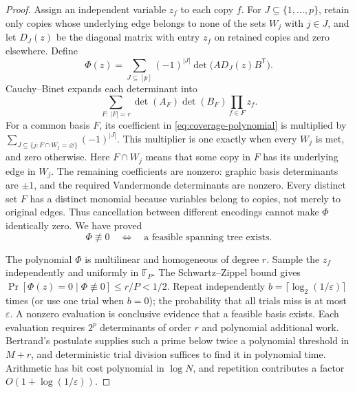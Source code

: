 \begin{proof}
Assign an independent variable $z_f$ to each copy $f$.  For
$J\subseteq\{1,\ldots,p\}$, retain only copies whose underlying edge
belongs to none of the sets $W_j$ with $j\in J$, and let $D_J(z)$ be the
diagonal matrix with entry $z_f$ on retained copies and zero elsewhere.
Define
\begin{equation}\label{eq:coverage-polynomial}
    \Phi(z)=\sum_{J\subseteq[p]}(-1)^{|J|}
                    \det\bigl(A D_J(z)B^{\mathsf T}\bigr).
\end{equation}
Cauchy--Binet expands each determinant into
\[
       \sum_{F:\,|F|=r}\det(A_F)\det(B_F)\prod_{f\in F}z_f.
\]
For a common basis $F$, its coefficient in \eqref{eq:coverage-polynomial}
is multiplied by
$\sum_{J\subseteq\{j:F\cap W_j=\varnothing\}}(-1)^{|J|}$.
This multiplier is one exactly when every $W_j$ is met, and zero otherwise.
Here $F\cap W_j$ means that some copy in $F$ has its underlying edge in
$W_j$.  The remaining coefficients are nonzero: graphic basis determinants
are $\pm1$, and the required Vandermonde determinants are nonzero.
Every distinct set $F$ has a distinct monomial because variables belong to
copies, not merely to original edges.  Thus cancellation between different
encodings cannot make $\Phi$ identically zero.  We have proved
\[
            \Phi\not\equiv0\quad\Longleftrightarrow\quad
            \text{a feasible spanning tree exists}.
\]

The polynomial $\Phi$ is multilinear and homogeneous of degree $r$.
Sample the $z_f$ independently and uniformly in $\mathbb F_P$.
The Schwartz--Zippel bound \cite{Schwartz1980,Zippel1979} gives
$\Pr[\Phi(z)=0\mid\Phi\not\equiv0]\leq r/P<1/2$.
Repeat independently $b=\lceil\log_2(1/\varepsilon)\rceil$ times
(or use one trial when $b=0$); the probability that all trials miss is at
most $\varepsilon$.  A nonzero evaluation is conclusive evidence that a
feasible basis exists.  Each evaluation requires $2^p$ determinants of order $r$ and polynomial
additional work.  Bertrand's postulate supplies such a prime below twice a polynomial
threshold in $M+r$, and deterministic trial division suffices to find it
in polynomial time.  Arithmetic has bit cost polynomial in $\log N$,
and repetition contributes a factor $O(1+\log(1/\varepsilon))$.


\end{proof}
